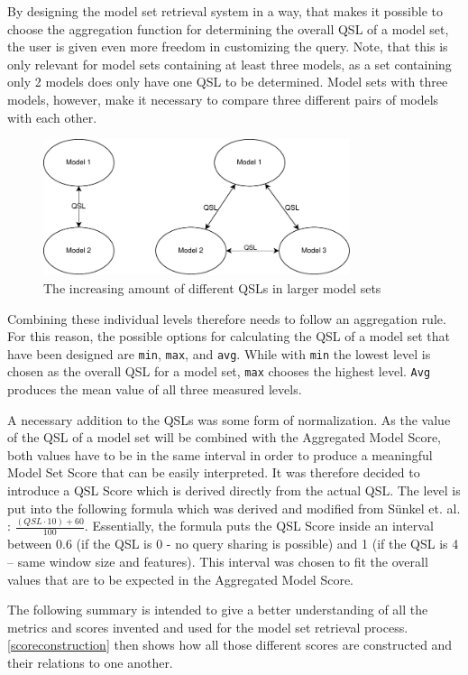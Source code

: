 By designing the model set retrieval system in a way, that makes it possible to choose the aggregation function for determining the overall QSL of a model set, the user is given even more freedom in customizing the query. Note, that this is only relevant for model sets containing at least three models, as a set containing only 2 models does only have one QSL to be determined. Model sets with three models, however, make it necessary to compare three different pairs of models with each other.

\begin{figure}[htbp]
  \centering
\includegraphics[height=4cm]{graphics/qsl}
  \caption{The increasing amount of different QSLs in larger model sets}
  \label{figure}
\end{figure}

Combining these individual levels therefore needs to follow an aggregation rule. For this reason, the possible options for calculating the QSL of a model set that have been designed are \texttt{min}, \texttt{max}, and \texttt{avg}. While with \texttt{min} the lowest level is chosen as the overall QSL for a model set, \texttt{max} chooses the highest level. \texttt{Avg} produces the mean value of all three measured levels.

A necessary addition to the QSLs was some form of normalization. As the value of the QSL of a model set will be combined with the Aggregated Model Score, both values have to be in the same interval in order to produce a meaningful Model Set Score that can be easily interpreted. It was therefore decided to introduce a QSL Score which is derived directly from the actual QSL. The level is put into the following formula which was derived and modified from Sünkel et. al. \cite{sunkel2022}:
$\frac{(QSL \cdot 10) + 60}{100}$.
Essentially, the formula puts the QSL Score inside an interval between 0.6 (if the QSL is 0 - no query sharing is possible) and 1 (if the QSL is 4 – same window size and features). This interval was chosen to fit the overall values that are to be expected in the Aggregated Model Score. 

The following summary is intended to give a better understanding of all the metrics and scores invented and used for the model set retrieval process. \autoref{scoreconstruction} then shows how all those different scores are constructed and their relations to one another.

